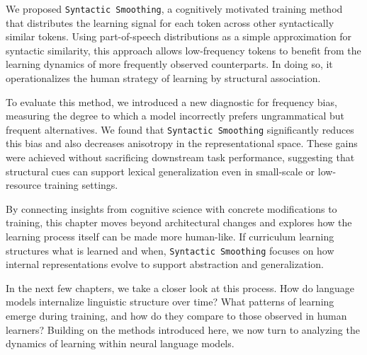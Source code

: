 We proposed \texttt{Syntactic Smoothing}, a cognitively motivated training method that distributes the learning signal for each token across other syntactically similar tokens. Using part-of-speech distributions as a simple approximation for syntactic similarity, this approach allows low-frequency tokens to benefit from the learning dynamics of more frequently observed counterparts. In doing so, it operationalizes the human strategy of learning by structural association.

To evaluate this method, we introduced a new diagnostic for frequency bias, measuring the degree to which a model incorrectly prefers ungrammatical but frequent alternatives. We found that \texttt{Syntactic Smoothing} significantly reduces this bias and also decreases anisotropy in the representational space. These gains were achieved without sacrificing downstream task performance, suggesting that structural cues can support lexical generalization even in small-scale or low-resource training settings.

By connecting insights from cognitive science with concrete modifications to training, this chapter moves beyond architectural changes and explores how the learning process itself can be made more human-like. If curriculum learning structures what is learned and when, \texttt{Syntactic Smoothing} focuses on how internal representations evolve to support abstraction and generalization.

In the next few chapters, we take a closer look at this process. How do language models internalize linguistic structure over time? What patterns of learning emerge during training, and how do they compare to those observed in human learners? Building on the methods introduced here, we now turn to analyzing the dynamics of learning within neural language models.
